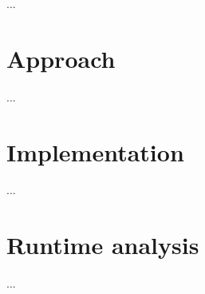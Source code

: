 

  ...
  
  \section{Approach}
    ...
  \section{Implementation}
    ...
  \section{Runtime analysis}
    ...
